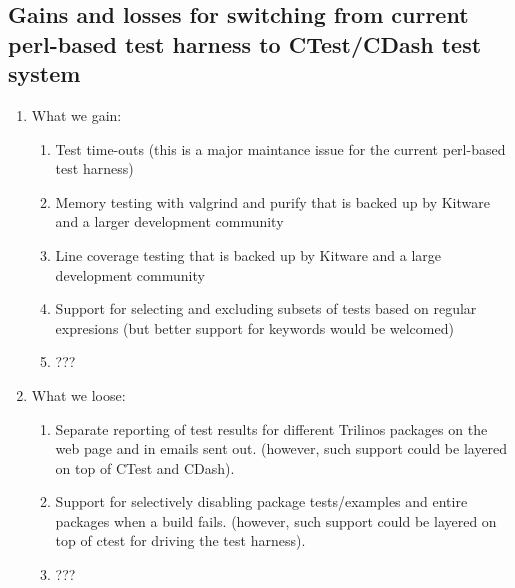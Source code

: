 \documentclass[pdf,ps2pdf,11pt]{SANDreport}
\begin{document}
%
\subsection{Gains and losses for switching from current perl-based test
harness to CTest/CDash test system}
%

\begin{enumerate}

{}\item What we gain:

  \begin{enumerate}

  {}\item Test time-outs (this is a major maintance issue for the
  current perl-based test harness)

  {}\item Memory testing with valgrind and purify that is backed up by
  Kitware and a larger development community

  {}\item Line coverage testing that is backed up by Kitware and a
  large development community

  {}\item Support for selecting and excluding subsets of tests based
  on regular expresions (but better support for keywords would be
  welcomed)

  {}\item ???

  \end{enumerate}

{}\item What we loose:

  \begin{enumerate}

  {}\item Separate reporting of test results for different Trilinos
  packages on the web page and in emails sent out. (however, such
  support could be layered on top of CTest and CDash).

  {}\item Support for selectively disabling package tests/examples and
  entire packages when a build fails.  (however, such support could be
  layered on top of ctest for driving the test harness).

  {}\item ???

  \end{enumerate}

\end{enumerate}
\end{document}
